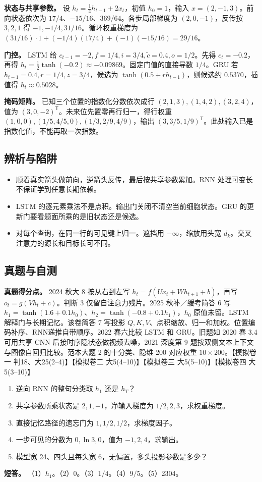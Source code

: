 \documentclass[UTF8,a4paper,zihao=-4,fontset=fandol]{ctexart}
\begin{document}
\textbf{状态与共享参数。} 设 $h_t=\tfrac14 h_{t-1}+2x_t$，初值 $h_0=1$，输入 $x=(2,-1,3)$。前向状态依次为 $17/4$、$-15/16$、$369/64$。各步局部梯度为 $(2,0,-1)$，反传按 $3,2,1$ 得 $-1,-1/4,31/16$。循环权重梯度为 $(31/16)\cdot1+(-1/4)(17/4)+(-1)(-15/16)=29/16$。

\textbf{门控。} LSTM 给 $c_{t-1}=-2,f=1/4,i=3/4,\tilde c=0.4,o=1/2$。先得 $c_t=-0.2$，再得 $h_t=\tfrac12\tanh(-0.2)\approx-0.09869$。固定门值的直接导数 $1/4$。GRU 若 $h_{t-1}=0.4,r=1/4,z=3/4$，候选为 $\tanh(0.5+r h_{t-1})$，则候选约 $0.5370$，插值得 $h_t\approx0.5028$。

\textbf{掩码矩阵。} 已知三个位置的指数化分数依次成行 $(2,1,3),(1,4,2),(3,2,4)$，值为 $(3,0,-2)^{\mathsf T}$。未来位先置零再行归一，得行权重 $(1,0,0),(1/5,4/5,0),(1/3,2/9,4/9)$，输出 $(3,3/5,1/9)^{\mathsf T}$。此处输入已是指数化值，不能再取一次指数。

\subsection{辨析与陷阱}

\begin{itemize}
\item 顺着真实箭头做前向，逆箭头反传，最后按共享参数累加。RNN 处理可变长不保证学到任意长期依赖。
\item LSTM 的逐元素乘法不是点积。输出门关闭不清空当前细胞状态。GRU 的更新门要看题面所乘的是旧状态还是候选。
\item 对每个查询，在同一行的可见键上归一。遮挡用 $-\infty$，缩放用头宽 $d_k$。交叉注意力的源长和目标长可不同。
\end{itemize}

\subsection{真题与自测}

\textbf{真题得分点。} 2024 秋大 8 按从右到左写 $h_t=f(Ux_t+Wh_{t+1}+b)$，再写 $o_t=g(Vh_t+c)$。判断 3 仅留自注意力残片。2025 秋补／缓考简答 6 写 $h_1=\tanh(1.6+0.1h_0)$、$h_2=\tanh(-0.8+0.1h_1)$，$h_0$ 原值未留。LSTM 解释门与长期记忆。该卷简答 7 写投影 $Q,K,V$、点积缩放、归一和加权。位置编码补序、RNN递推自带顺序。2022 春六比较 LSTM 和 GRU。旧题如 2020 春 3.4 可用共享 CNN 后接时序隐状态做视频去噪，2021 深度第 9 题按双侧文本上下文与图像自回归比较。范本大题 2 的十分类、隐维 200 对应权重 $10\times200$。【模拟卷一 判18、大25(2--4)】【模拟卷二 大5(4--10)】【模拟卷三 大5(5--10)】【模拟卷四 大5(3--10)】

\begin{enumerate}
\item 逆向 RNN 的整句分类取 $h_1$ 还是 $h_T$？
\item 共享参数所乘状态是 $2,1,-1$，净输入梯度为 $1/2,2,3$，求权重梯度。
\item 直接记忆路径的遗忘门为 $1,1/2,1/2$，求梯度因子。
\item 一步可见的分数为 $0,\ln3,0$，值为 $-1,2,4$，求输出。
\item 模型宽 24、四头且每头宽 6，无偏置，多头投影参数是多少？
\end{enumerate}
\textbf{短答。} （1）$h_1$。（2）0。（3）$1/4$。（4）$9/5$。（5）2304。
\end{document}

